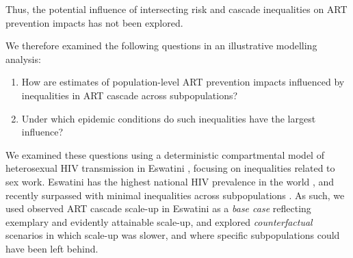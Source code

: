 Thus, the potential influence of intersecting risk and cascade inequalities
on ART prevention impacts has not been explored.
\par
We therefore examined the following questions in an illustrative modelling analysis:
\begin{enumerate}
  \item\label{obj:art.1} How are estimates of population-level ART prevention impacts
    influenced by inequalities in ART cascade across subpopulations?
  \item\label{obj:art.2} Under which epidemic conditions
    do such inequalities have the largest influence?
\end{enumerate}
We examined these questions using
a deterministic compartmental model of heterosexual HIV transmission in Eswatini \cite{Knight2019},
focusing on inequalities related to sex work.
Eswatini has the highest national HIV prevalence in the world \cite{UNAIDS2021},
and recently surpassed \cashi with minimal inequalities across subpopulations
\cite{Walsh2020,SHIMS3,AIDSinfo}.
As such, we used observed ART cascade scale-up in Eswatini as a \emph{base case}
reflecting exemplary and evidently attainable scale-up,
and explored \emph{counterfactual} scenarios in which scale-up was slower,
and where specific subpopulations could have been left behind.
